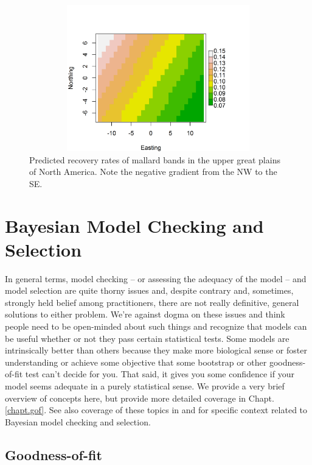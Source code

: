\begin{figure}[ht]
\begin{center}
\includegraphics[height=2.5in,width=5in]{Ch3-Bayes/figs/mallard_gradient}
\end{center}
\caption{Predicted recovery rates of mallard bands in the upper great
  plains of North America. Note the negative gradient from the NW to
  the SE.}
\label{glms.fig.bandrecovery}
\end{figure}

\section{Bayesian Model Checking and Selection}
\label{glms.sec.modsel}

In general terms,  model checking -- or assessing the adequacy of the
model -- and model selection are quite thorny issues and, despite
contrary and, sometimes, strongly held belief among practitioners, there are not
really definitive, general solutions to either problem. We're against
dogma on these issues and think people need to be open-minded about
such things and recognize that models can be useful whether or not
they pass certain statistical tests. Some models are intrinsically
better than others because they make more biological sense or foster
understanding or achieve some objective that some  bootstrap
or other goodness-of-fit test can't decide for you. That said, it
gives you some confidence if your model seems adequate in a purely statistical
sense.
We provide a very brief overview of concepts here, but provide more
detailed coverage in Chapt. \ref{chapt.gof}.
See also coverage of these topics in
\citet[][]{kery:2010} and
\citet[][]{link_barker:2010}
for specific context related to Bayesian
model checking and selection.

\subsection{Goodness-of-fit}
\label{glms.sec.gof}

